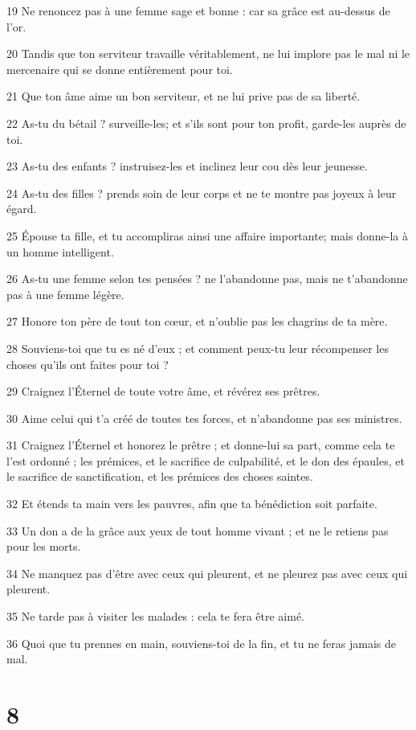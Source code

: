 \par 19 Ne renoncez pas à une femme sage et bonne : car sa grâce est au-dessus de l'or.
\par 20 Tandis que ton serviteur travaille véritablement, ne lui implore pas le mal ni le mercenaire qui se donne entièrement pour toi.
\par 21 Que ton âme aime un bon serviteur, et ne lui prive pas de sa liberté.
\par 22 As-tu du bétail ? surveille-les; et s'ils sont pour ton profit, garde-les auprès de toi.
\par 23 As-tu des enfants ? instruisez-les et inclinez leur cou dès leur jeunesse.
\par 24 As-tu des filles ? prends soin de leur corps et ne te montre pas joyeux à leur égard.
\par 25 Épouse ta fille, et tu accompliras ainsi une affaire importante; mais donne-la à un homme intelligent.
\par 26 As-tu une femme selon tes pensées ? ne l'abandonne pas, mais ne t'abandonne pas à une femme légère.
\par 27 Honore ton père de tout ton cœur, et n'oublie pas les chagrins de ta mère.
\par 28 Souviens-toi que tu es né d'eux ; et comment peux-tu leur récompenser les choses qu'ils ont faites pour toi ?
\par 29 Craignez l'Éternel de toute votre âme, et révérez ses prêtres.
\par 30 Aime celui qui t'a créé de toutes tes forces, et n'abandonne pas ses ministres.
\par 31 Craignez l'Éternel et honorez le prêtre ; et donne-lui sa part, comme cela te l'est ordonné ; les prémices, et le sacrifice de culpabilité, et le don des épaules, et le sacrifice de sanctification, et les prémices des choses saintes.
\par 32 Et étends ta main vers les pauvres, afin que ta bénédiction soit parfaite.
\par 33 Un don a de la grâce aux yeux de tout homme vivant ; et ne le retiens pas pour les morts.
\par 34 Ne manquez pas d'être avec ceux qui pleurent, et ne pleurez pas avec ceux qui pleurent.
\par 35 Ne tarde pas à visiter les malades : cela te fera être aimé.
\par 36 Quoi que tu prennes en main, souviens-toi de la fin, et tu ne feras jamais de mal.

\chapter{8}

